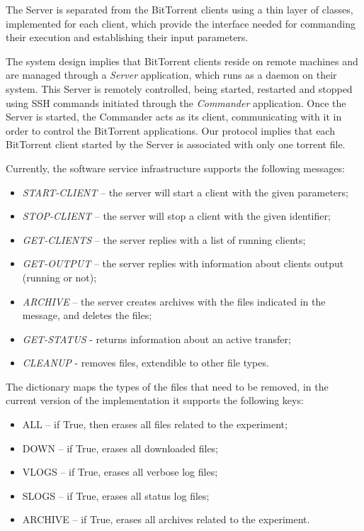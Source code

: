 The Server is separated from the BitTorrent clients using a thin layer of
classes, implemented for each client, which provide the interface needed for
commanding their execution and establishing their input parameters.

The system design implies that BitTorrent clients reside on remote machines
and are managed through a \textit{Server} application, which runs as a daemon
on their system. This Server is remotely controlled, being started, restarted
and stopped using SSH commands initiated through the \textit{Commander}
application. Once the Server is started, the Commander acts as its client,
communicating with it in order to control the BitTorrent applications. Our
protocol implies that each BitTorrent client started by the Server is
associated with only one torrent file.

Currently, the software service infrastructure supports the following messages:
\begin{itemize}
  \item \textit{START-CLIENT} -- the server will start a client with the given
  parameters;
  \item \textit{STOP-CLIENT} -- the server will stop a client with the given
  identifier;
  \item \textit{GET-CLIENTS} -- the server replies with a list of running
  clients;
  \item \textit{GET-OUTPUT} -- the server replies with information about
  clients output (running or not);
  \item \textit{ARCHIVE } -- the server creates archives with the files
  indicated in the message, and deletes the files;
  \item \textit{GET-STATUS} - returns information about an active transfer;
  \item \textit{CLEANUP} - removes files, extendible to other file types.
\end{itemize}

The dictionary maps the types of the files that need to be removed, in the
current version of the implementation it supports the following keys:

\begin{itemize}
  \item ALL -- if True, then erases all files related to the experiment;
  \item DOWN -- if True, erases all downloaded files;
  \item VLOGS -- if True, erases all verbose log files;
  \item SLOGS -- if True, erases all status log files;
  \item ARCHIVE -- if True, erases all archives related to the experiment.
\end{itemize}

